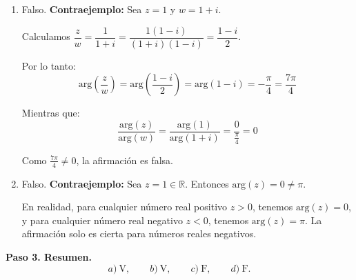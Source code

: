 \begin{prob}
\begin{myproof}
\begin{enumerate}[$a)$]
Por el principio de inducción matemática, $|z^n|=|z|^n$ para todo entero positivo $n$.

\item Falso. \textbf{Contraejemplo:} 
Sea $z=1$ y $w=1+i$. 

Calculamos $\dfrac{z}{w} = \dfrac{1}{1+i} = \dfrac{1(1-i)}{(1+i)(1-i)} = \dfrac{1-i}{2}$.

Por lo tanto:
$$\text{arg}\left(\dfrac{z}{w}\right) = \text{arg}\left(\dfrac{1-i}{2}\right) = \text{arg}(1-i) = -\frac{\pi}{4} = \frac{7\pi}{4}$$

Mientras que:
$$\dfrac{\text{arg}(z)}{\text{arg}(w)} = \dfrac{\text{arg}(1)}{\text{arg}(1+i)} = \dfrac{0}{\frac{\pi}{4}} = 0$$

Como $\frac{7\pi}{4} \neq 0$, la afirmación es falsa.

\item Falso. \textbf{Contraejemplo:} 
Sea $z=1 \in \mathbb{R}$. Entonces $\text{arg}(z) = 0 \neq \pi$. 

En realidad, para cualquier número real positivo $z > 0$, tenemos $\text{arg}(z) = 0$, y para cualquier número real negativo $z < 0$, tenemos $\text{arg}(z) = \pi$. La afirmación solo es cierta para números reales negativos.
\end{enumerate}

\textbf{Paso 3. Resumen.}
\[
\boxed{a)\ \text{V},\qquad b)\ \text{V},\qquad c)\ \text{F},\qquad d)\ \text{F}.}
\]
\end{myproof}
\end{prob}


